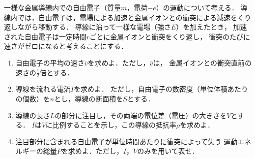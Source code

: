 \documentclass[../../../all/physics-standard_questions_all.tex]{subfiles}
\begin{document}
\setlength{\abovedisplayskip}{2mm}
\setlength{\belowdisplayskip}{1mm}

一様な金属導線内での自由電子（質量$m$，電荷$-e$）の運動について考える．
導線内では，自由電子は，電場による加速と金属イオンとの衝突による減速をくり返しながら移動する．
導線に沿って一様な電場（強さ$E$）を加えたとき，
加速された自由電子は一定時間$r$ごとに金属イオンと衝突をくり返し，
衝突のたびに速さがゼロになると考えることにする．

\begin{enumerate}
    \item 自由電子の平均の速さ$\overline{v}$を求めよ．ただし，$\overline{v}$は，
        金属イオンとの衝突直前の速さの$\displaystyle \frac{1}{2}$倍とする．

    \item 導線を流れる電流$I$を求めよ．
        ただし，自由電子の数密度（単位体積あたりの個数）を$n$とし，導線の断面積を$S$とする．

    \item 導線の長さ$L$の部分に注目し，その両端の電位差（電圧）の大きさを$V$とする．
        $I$は$V$に比例することを示し，この導線の抵抗率$\rho$を求めよ．

    \item 注目部分に含まれる自由電子が単位時間あたりに衝突によって失う
        運動エネルギーの総量$P$を求めよ．ただし，$I$，$V$のみを用いて表せ．
    
    
\end{enumerate}
\end{document}
